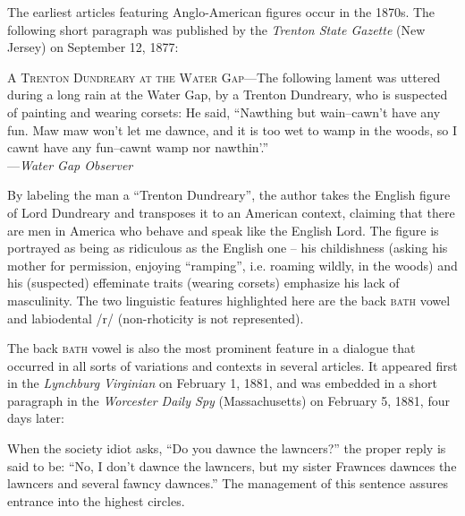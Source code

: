 The earliest articles featuring Anglo-American figures occur in the 1870s. The following short paragraph was published by the \emph{Trenton State Gazette} (New Jersey) on September 12, 1877:

\begin{ipquote}
\textsc{A Trenton Dundreary at the Water Gap}—The following lament was uttered during a long rain at the Water Gap, by a Trenton Dundreary, who is suspected of painting and wearing corsets: He said, “Nawthing but wain–cawn’t have any fun. Maw maw won’t let me dawnce, and it is too wet to wamp in the woods, so I cawnt have any fun–cawnt wamp nor nawthin’.”\\---\textit{Water Gap Observer}
\end{ipquote}


By labeling the man a “Trenton Dundreary”, the author takes the English figure of Lord Dundreary and transposes it to an American context, claiming that there are men in America who behave and speak like the English Lord. The figure is portrayed as being as ridiculous as the English one – his childishness (asking his mother for permission, enjoying “ramping”, i.e. roaming wildly, in the woods) and his (suspected) effeminate traits (wearing corsets) emphasize his lack of masculinity. The two linguistic features highlighted here are the back \textsc{bath} vowel and labiodental /r/ (non-rhoticity is not represented).


The back \textsc{bath} vowel is also the most prominent feature in a dialogue that occurred in all sorts of variations and contexts in several articles. It appeared first in the \emph{Lynchburg Virginian} on February 1, 1881, and was embedded in a short paragraph in the \emph{Worcester Daily Spy} (Massachusetts) on February 5, 1881, four days later:

\begin{ipquote}
When the society idiot asks, “Do you dawnce the lawncers?” the proper reply is said to be: “No, I don't dawnce the lawncers, but my sister Frawnces dawnces the lawncers and several fawncy dawnces.” The management of this sentence assures entrance into the highest circles.
\end{ipquote}


